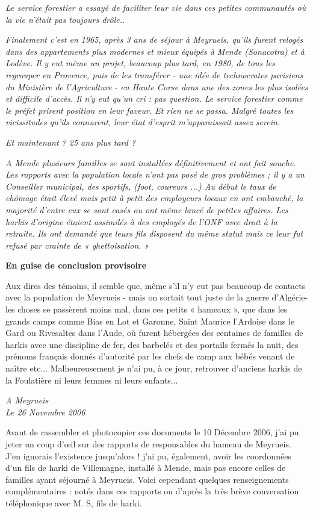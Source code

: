 \textit{Le service forestier a essayé de faciliter leur vie dans ces petites communautés où la
vie n’était pas toujours drôle..}

\textit{Finalement c’est en 1965, après 3 ans de séjour à Meyrueis, qu’ils furent relogés
dans des appartements plus modernes et mieux équipés à Mende (Sonacotra) et à
Lodève.
Il y eut même un projet, beaucoup plus tard, en 1980, de tous les regrouper en
Provence, puis de les transférer - une idée de technocrates parisiens du Ministère
de l’Agriculture - en Haute Corse dans une des zones les plus isolées et difficile
d’accès. Il n’y eut qu’un cri : pas question. Le service forestier comme le préfet
prirent position en leur faveur. Et rien ne se passa. Malgré toutes les vicissitudes
qu’ils connurent, leur état d’esprit m’apparaissait assez serein.}

\textit{Et maintenant ? 25 ans plus tard ?}

\textit{A Mende plusieurs familles se sont installées définitivement et ont fait souche. Les
rapports avec la population locale n’ont pas posé de gros problèmes ; il y a un
Conseiller municipal, des sportifs, (foot, coureurs ...) Au début le taux de chômage
était élevé mais petit à petit des employeurs locaux en ont embauché, la majorité
d’entre eux se sont casés ou ont même lancé de petites affaires.
Les harkis d’origine étaient assimilés à des employés de l’ONF avec droit à la
retraite. Ils ont demandé que leurs fils disposent du même statut mais ce leur fut
refusé par crainte de « ghettoisation. »}

\begin{center}
\textbf{En guise de conclusion provisoire}
\end{center}

Aux dires des témoins, il semble que, même s’il n’y eut pas beaucoup de contacts
avec la population de Meyrueis - mais on sortait tout juste de la guerre d’Algérie- les
choses se passèrent moins mal, dans ces petits « hameaux », que dans les grands
camps comme Bias en Lot et Garonne, Saint Maurice l’Ardoise dans le Gard ou
Rivesaltes dans l’Aude, où furent hébergées des centaines de familles de harkis avec
une discipline de fer, des barbelés et des portails fermés la nuit, des prénoms français
donnés d’autorité par les chefs de camp aux bébés venant de naître etc...
Malheureusement je n’ai pu, à ce jour, retrouver d’anciens harkis de la Foulatière ni
leurs femmes ni leurs enfants...

\begin{flushright}
\textit{A Meyrueis\\
Le 26 Novembre 2006}
\end{flushright}

Avant de rassembler et photocopier ces documents le 10 Décembre 2006, j’ai pu jeter
un coup d’œil sur des rapports de responsables du hameau de Meyrueis. J’en ignorais
l’existence jusqu’alors ! j’ai pu, également, avoir les coordonnées d’un fils de harki
de Villemagne, installé à Mende, mais pas encore celles de familles ayant séjourné à
Meyrueis. Voici cependant quelques renseignements complémentaires : notés dans ces
rapports ou d’après la très brève conversation téléphonique avec M. S, fils de harki.



